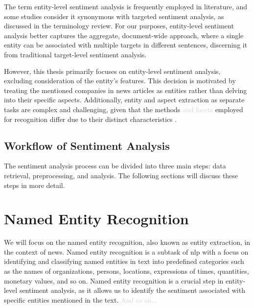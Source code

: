 
The term entity-level sentiment analysis is frequently employed in literature, and some studies consider it synonymous with targeted sentiment analysis, \linebreak as discussed \cite{ronningstad-etal-2022-entity} in the terminology review. For our purposes, entity-level sentiment analysis better captures the aggregate, document-wide approach, where a single entity can be associated with multiple targets in different sentences, discerning it from traditional target-level sentiment analysis. 

However, this thesis primarily focuses on entity-level sentiment analysis, excluding consideration of the entity's features. This decision is motivated by treating the mentioned companies in news articles as entities rather than delving into their specific aspects. Additionally, entity and aspect extraction as separate tasks are complex and challenging, given that the methods \textcolor{lightgray}{and facets} employed for recognition differ due to their distinct characteristics \parencite{Liu2015, Zhang2014}. 

\subsection{Workflow of Sentiment Analysis}
\label{subsec:workflow-of-sentiment-analysis}
The sentiment analysis process can be divided into three main steps: data retrieval, preprocessing, and analysis. The following sections will discuss these steps in more detail.

\section{Named Entity Recognition}
\label{sec:named-entity-recognition}
We will focus on the named entity recognition, also known as entity extraction, in the context of news. 
Named entity recognition is a subtask of \acrshort{nlp} with a focus on identifying and classifying named entities in text into predefined categories such as the names of organizations, persons, locations, expressions of times, quantities, monetary values, and so on. Named entity recognition is a crucial step in entity-level sentiment analysis, as it allows us to identify the sentiment associated with specific entities mentioned in the text. \textcolor{lightgray}{And so on...} %

